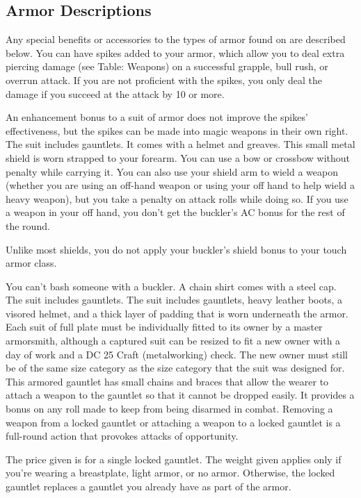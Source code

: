 \subsection{Armor Descriptions}
Any special benefits or accessories to the types of armor found on  are described below.
 You can have spikes added to your armor, which allow you to deal extra piercing damage (see Table: Weapons) on a successful grapple, bull rush, or overrun attack. If you are not proficient with the spikes, you only deal the damage if you succeed at the attack by 10 or more.
\par An enhancement bonus to a suit of armor does not improve the spikes' effectiveness, but the spikes can be made into magic weapons in their own right.
 The suit includes gauntlets.
 It comes with a helmet and greaves.
 This small metal shield is worn strapped to your forearm. You can use a bow or crossbow without penalty while carrying it. You can also use your shield arm to wield a weapon (whether you are using an off-hand weapon or using your off hand to help wield a heavy weapon), but you take a  penalty on attack rolls while doing so. If you use a weapon in your off hand, you don't get the buckler's AC bonus for the rest of the round.
\par Unlike most shields, you do not apply your buckler's shield bonus to your touch armor class.
\par You can't bash someone with a buckler.
 A chain shirt comes with a steel cap.
 The suit includes gauntlets.
 The suit includes gauntlets, heavy leather boots, a visored helmet, and a thick layer of padding that is worn underneath the armor. Each suit of full plate must be individually fitted to its owner by a master armorsmith, although a captured suit can be resized to fit a new owner with a day of work and a DC 25 Craft (metalworking) check. The new owner must still be of the same size category as the size category that the suit was designed for.
 This armored gauntlet has small chains and braces that allow the wearer to attach a weapon to the gauntlet so that it cannot be dropped easily. It provides a  bonus on any roll made to keep from being disarmed in combat. Removing a weapon from a locked gauntlet or attaching a weapon to a locked gauntlet is a full-round action that provokes attacks of opportunity.
\par The price given is for a single locked gauntlet. The weight given applies only if you're wearing a breastplate, light armor, or no armor. Otherwise, the locked gauntlet replaces a gauntlet you already have as part of the armor.
